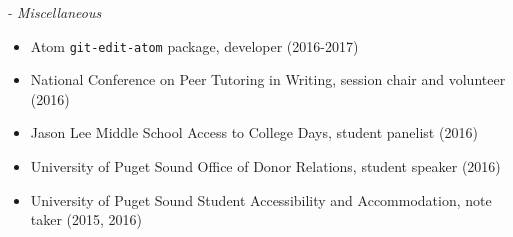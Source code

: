 \vspace{-3.5mm}
\textit{- Miscellaneous}
\begin{itemize}
\item Atom \texttt{git-edit-atom} package, developer (2016-2017)
\item National Conference on Peer Tutoring in Writing, session chair and volunteer (2016)
\item Jason Lee Middle School Access to College Days, student panelist (2016)
\item University of Puget Sound Office of Donor Relations, student speaker (2016)
\item University of Puget Sound Student Accessibility and Accommodation, note taker (2015, 2016)
\end{itemize}
\vspace{-3.5mm}
